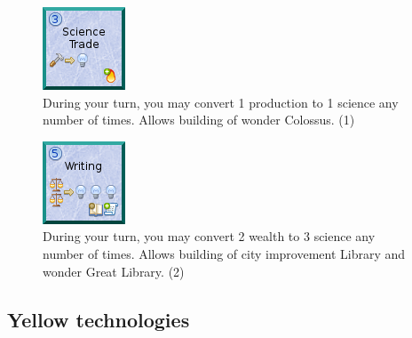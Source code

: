\documentclass[11pt,a4paper,titlepage]{article}
\begin{document}
{{  \begin{figure}[!htb]
    \begin{minipage}[c]{0.1\textwidth}
      \includegraphics[scale=.7]{doe_tech_science_trade.png}
    \end{minipage}\hfill
    \begin{minipage}[c]{0.6\textwidth}
      \captionsetup{labelformat=empty, justification=justified, singlelinecheck=false}
      \caption{During your turn, you may convert 1 production to 1 science any number of times. Allows building of wonder Colossus. (1)}
    \end{minipage}\hfill
    \label{fig:tech_science_trade}
  \end{figure}

  \begin{figure}[!htb]
    \begin{minipage}[c]{0.1\textwidth}
      \includegraphics[scale=.7]{doe_tech_writing.png}
    \end{minipage}\hfill
    \begin{minipage}[c]{0.6\textwidth}
      \captionsetup{labelformat=empty, justification=justified, singlelinecheck=false}
      \caption{During your turn, you may convert 2 wealth to 3 science any number of times. Allows building of city improvement Library and wonder Great Library. (2)}
    \end{minipage}\hfill
    \label{fig:tech_writing}
  \end{figure}

  }\label{subsec:blue_technologies}
  \newpage
  \subsection{Yellow technologies}{

}}
\end{document}
